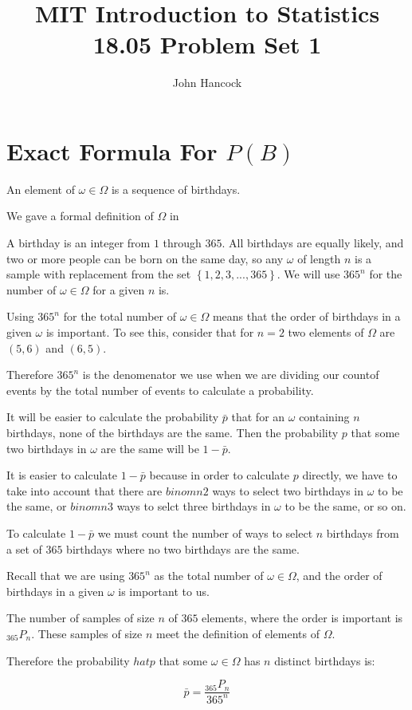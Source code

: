 \documentclass[a4paper,11pt]{article}
\author{John Hancock}
\title{MIT Introduction to Statistics 18.05 Problem Set 1}
\begin{document}
\maketitle
\tableofcontents
\section{Exact Formula For $P\left(B\right)$}
An element of $\omega \in \Omega$ is a sequence of birthdays.  

We gave a formal definition of $\Omega$ in

A birthday is an integer from $1$ through $365$. 
All birthdays are equally likely, and two or more people can be born on
the same day, so any $\omega$ of length $n$ is a sample with replacement
from the set $\left\{ 1, 2, 3, ..., 365 \right\}$. We will use
$365^{n}$ for the number of $\omega \in \Omega$ for a given $n$ is.

Using $365^{n}$ for the total number of $\omega \in \Omega$ means
that the order of birthdays in a given $\omega$ is important.
To see this, consider that for $n=2$ two elements of $\Omega$ are
$\left( 5, 6 \right)$ and $\left(6, 5\right)$.

Therefore $365^{n}$ is the denomenator we use when we are dividing our
countof events by the total number of events to calculate a probability.

It will be easier to calculate the probability $\bar{p}$ that for an
$\omega$ containing $n$ birthdays, none of the birthdays are the same.
Then the probability $p$ that some two birthdays in $\omega$ are the
same  will be $1-\bar{p}$.

It is easier to calculate $1-\bar{p}$ because in order to calculate $p$
directly, we have to take into account that there are $binom{n}{2}$
ways to select two birthdays in $\omega$ to be the same, or 
$binom{n}{3}$ ways to selct three birthdays in $\omega$ to be the same,
or so on.

To calculate $1-\bar{p}$ we must count the number of ways to select $n$
birthdays from a set of $365$ birthdays where no two birthdays are the
same.

Recall that we are using $365^{n}$ as the total number of
$\omega \in \Omega$, and the order of birthdays in a given $\omega${}
is important to us.

The number of samples of size $n$ of $365$ elements, where the order
is important is ${}_{365}P_{n}$. These samples of size $n$ meet the
definition of elements of $\Omega$.

Therefore the probability $hat{p}$ that some $\omega \in \Omega$ has
$n$ distinct birthdays is:

\begin{equation}
  \bar{p} = \frac {{}_{365}P_{n}} {365^{n}}
\end{equation}
\end{document}
